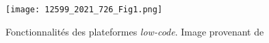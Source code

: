 \begin{figure}[htb]
\centering
\texttt{[image: 12599\_2021\_726\_Fig1.png]}
\caption{Fonctionnalités des plateformes \textit{low-code}. Image provenant de~\cite{LC_bock_2021}}
\label{fig:lcnc_plateform}
\end{figure}


